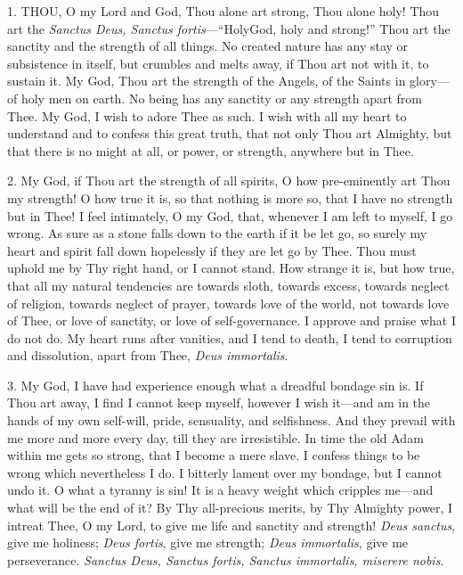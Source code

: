 
1. THOU,
O my Lord and God, Thou alone art strong, Thou alone holy! Thou art the \emph{Sanctus
Deus, Sanctus fortis}—``Holy\emph{}God, holy and strong!'' Thou art
the sanctity and the strength of all things. No created nature has any
stay or subsistence in itself, but crumbles and melts away, if Thou art
not with it, to sustain it. My God, Thou art the strength of the
Angels, of the Saints in glory—of holy men on earth. No being has any
sanctity or any strength apart from Thee. My God, I wish to adore Thee
as such. I wish with all my heart to understand and to confess this
great truth, that not only Thou art Almighty, but that there is no might
at all, or power, or strength, anywhere but in Thee.

2. My God, if Thou art the
strength of all spirits, O how pre-eminently art Thou my strength! O how
true it is, so that nothing is more so, that I have no strength but in
Thee! I feel intimately, O my God, that, whenever I am left to myself, I
go wrong. As sure as a stone falls down to the earth if it be let go, so
surely my heart and spirit fall down hopelessly if they are let go by
Thee. Thou must uphold me by Thy right hand, or I cannot stand. How
strange it is, but how true, that all my natural tendencies are towards
sloth, towards excess, towards neglect of religion, towards neglect of
prayer, towards love of the world, not towards love of Thee, or love of
sanctity, or love of self-governance. I approve and praise what I do not
do. My heart runs after vanities, and I tend to death, I tend to
corruption and dissolution, apart from Thee, \emph{Deus immortalis}.

3. My God, I have had experience
enough what a dreadful bondage sin is. If Thou art away, I find I cannot
keep myself, however I wish it—and am in the hands of my own
self-will, pride, sensuality, and selfishness. And they prevail with me
more and more every day, till they are irresistible. In time the old
Adam within me gets so strong, that I become a mere slave. I
confess things to be wrong which nevertheless I do. I bitterly lament
over my bondage, but I cannot undo it. O what a tyranny is sin! It is a
heavy weight which cripples me—and what will be the end of it? By Thy
all-precious merits, by Thy Almighty power, I intreat Thee, O my Lord,
to give me life and sanctity and strength! \emph{Deus sanctus}, give me
holiness; \emph{Deus fortis}, give me strength; \emph{Deus immortalis},
give me perseverance. \emph{Sanctus Deus, Sanctus fortis, Sanctus
immortalis, miserere nobis}.

